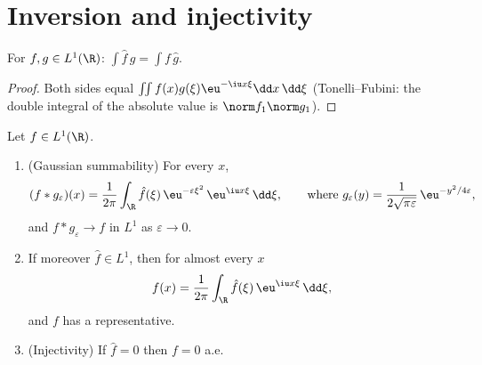 \section{Inversion and injectivity}

\begin{lemma}
\label{lem:b3:fouriertransform:multiplication}
For $f, g \in L^1(\R)$: $\displaystyle\int \hat f\,g =
\int f\,\hat g$.
\end{lemma}

\begin{proof}
Both sides equal $\iint f(x)g(\xi)\eu^{-\iu x\xi}\dd
x\,\dd\xi$ (Tonelli--Fubini: the double integral of the
absolute value is $\norm f_1\norm g_1$).
\end{proof}

\begin{theorem}[Inversion]\label{thm:b3:fouriertransform:inversion}
Let $f \in L^1(\R)$.
\begin{enumerate}
  \item (Gaussian summability) For every $x$,
        \[
        (f * g_\varepsilon)(x) =
        \frac1{2\pi}\int_\R \hat f(\xi)\,
        \eu^{-\varepsilon\xi^2}\,\eu^{\iu x\xi}\,\dd\xi,
        \qquad\text{where } g_\varepsilon(y) =
        \frac{1}{2\sqrt{\pi\varepsilon}}\,
        \eu^{-y^2/4\varepsilon},
        \]
        and $f * g_\varepsilon \to f$ in $L^1$ as $\varepsilon
        \to 0$.
  \item If moreover $\hat f \in L^1$, then for almost every
        $x$
        \[
        f(x) = \frac{1}{2\pi}\int_\R \hat
        f(\xi)\,\eu^{\iu x\xi}\,\dd\xi ,
        \]
        and $f$ has a  representative.
  \item (Injectivity) If $\hat f = 0$ then $f = 0$ a.e.
\end{enumerate}
\end{theorem}

